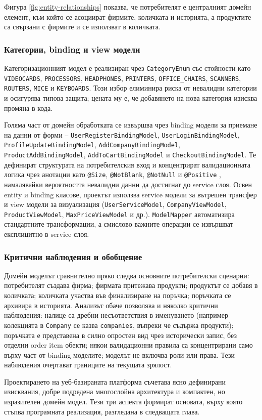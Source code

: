 Фигура \ref{fig:entity-relationships} показва, че потребителят е централният домейн елемент, към който се асоциират фирмите, количката и историята, а продуктите са свързани с фирмите и се използват в количката.

\subsubsection{Категории, binding и view модели}

Категоризационният модел е реализиран чрез \texttt{CategoryEnum} със стойности като \texttt{VIDEOCARDS}, \texttt{PROCESSORS}, \texttt{HEADPHONES}, \texttt{PRINTERS}, \texttt{OFFICE\_CHAIRS}, \texttt{SCANNERS}, \texttt{ROUTERS}, \texttt{MICE} и \texttt{KEYBOARDS}. Този избор елиминира риска от невалидни категории и осигурява типова защита; цената му е, че добавянето на нова категория изисква промяна в кода.

Голяма част от домейн обработката се извършва чрез binding модели за приемане на данни от форми -- \texttt{UserRegisterBindingModel}, \texttt{UserLoginBindingModel}, \texttt{ProfileUpdateBindingModel}, \texttt{AddCompanyBindingModel}, \texttt{ProductAddBindingModel}, \texttt{AddToCartBindingModel} и \texttt{CheckoutBindingModel}. Те дефинират структурата на потребителския вход и концентрират валидационната логика чрез анотации като \texttt{@Size}, \texttt{@NotBlank}, \texttt{@NotNull} и \texttt{@Positive} \cite{hibernatevalidator}, намалявайки вероятността невалидни данни да достигнат до service слоя. Освен entity и binding класове, проектът използва service модели за вътрешен трансфер и view модели за визуализация (\texttt{UserServiceModel}, \texttt{CompanyViewModel}, \texttt{ProductViewModel}, \texttt{MaxPriceViewModel} и др.). \texttt{ModelMapper} автоматизира стандартните трансформации, а смислово важните операции се извършват експлицитно в service слоя.

\subsubsection{Критични наблюдения и обобщение}

Домейн моделът сравнително пряко следва основните потребителски сценарии: потребителят създава фирма; фирмата притежава продукти; продуктът се добавя в количката; количката участва във финализиране на поръчка; поръчката се архивира в историята. Анализът обаче позволява и няколко критични наблюдения: налице са дребни несъответствия в именуването (например колекцията в \texttt{Company} се казва \texttt{companies}, въпреки че съдържа продукти); поръчката е представена в силно опростен вид чрез исторически запис, без отделни order item обекти; някои валидационни правила са концентрирани само върху част от binding моделите; моделът не включва роли или права. Тези наблюдения очертават границите на текущата зрялост.

Проектирането на уеб-базираната платформа съчетава ясно дефинирани изисквания, добре подредена многослойна архитектура и компактен, но изразителен домейн модел. Тези три аспекта формират основата, върху която стъпва програмната реализация, разгледана в следващата глава.

